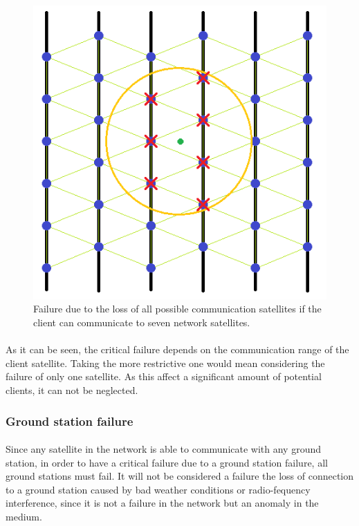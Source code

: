 \begin{figure}[H]
\begin{center}
\includegraphics[scale=0.5]{./sections/Constellation_Deployment/S5-Spare_Strategy/critical3.png}
\caption[7 communication range failure]{Failure due to the loss of all possible communication satellites if the client can communicate to seven network satellites.}
\label{fig:critical3}
\end{center}
\end{figure}

\paragraph{}As it can be seen, the critical failure depends on the communication range of the client satellite. Taking the more restrictive one would mean considering the failure of only one satellite. As this affect a significant amount of potential clients, it can not be neglected.

\subsubsection{Ground station failure}

\paragraph{}Since any satellite in the network is able to communicate with any ground station, in order to have a critical failure due to a ground station failure, all ground stations must fail. It will not be considered a failure the loss of connection to a ground station caused by bad weather conditions or radio-fequency interference, since it is not a failure in the network but an anomaly in the medium.

